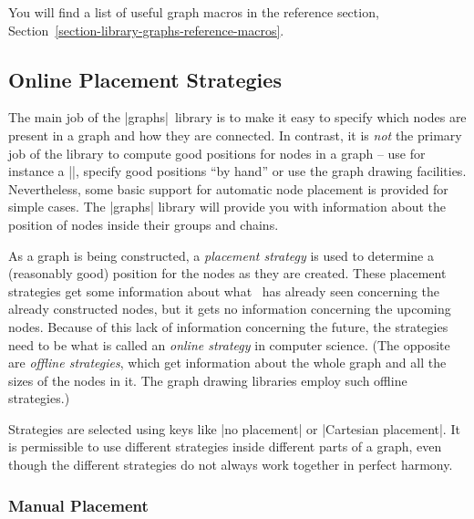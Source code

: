 You will find a list of useful graph macros in the reference section,
Section~\ref{section-library-graphs-reference-macros}.


\subsection{Online Placement Strategies}
\label{section-library-graphs-placement}

The main job of the |graphs| library is to make it easy to specify which nodes
are present in a graph and how they are connected. In contrast, it is
\emph{not} the primary job of the library to compute good positions for nodes
in a graph -- use for instance a |\matrix|, specify good positions ``by hand''
or use the graph drawing facilities. Nevertheless, some basic support for
automatic node placement is provided for simple cases. The |graphs| library
will provide you with information about the position of nodes inside their
groups and chains.

As a graph is being constructed, a \emph{placement strategy} is used to
determine a (reasonably good) position for the nodes as they are created. These
placement strategies get some information about what \tikzname\ has already
seen concerning the already constructed nodes, but it gets no information
concerning the upcoming nodes. Because of this lack of information concerning
the future, the strategies need to be what is called an \emph{online strategy}
in computer science. (The opposite are \emph{offline strategies}, which get
information about the whole graph and all the sizes of the nodes in it. The
graph drawing libraries employ such offline strategies.)

Strategies are selected using keys like |no placement| or
|Cartesian placement|. It is permissible to use different strategies inside
different parts of a graph, even though the different strategies do not always
work together in perfect harmony.


\subsubsection{Manual Placement}
\label{section-graphs-xy}

